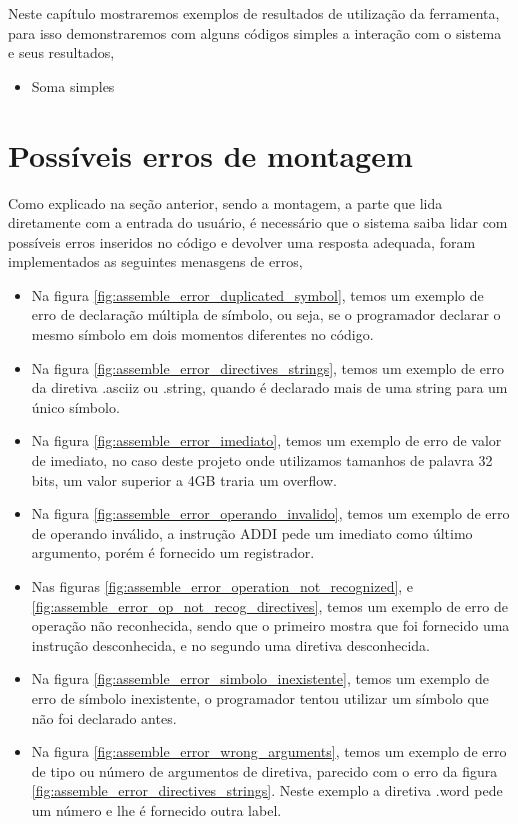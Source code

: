 Neste capítulo mostraremos exemplos de resultados de utilização da ferramenta, para isso demonstraremos com alguns códigos simples a interação com o sistema e seus resultados,

\begin{itemize}
	\item Soma simples
\end{itemize}


\section{Possíveis erros de montagem}

	Como explicado na seção anterior, sendo a montagem, a parte que lida diretamente com a entrada do usuário, é necessário que o sistema saiba lidar com possíveis erros inseridos no código e devolver uma resposta adequada, foram implementados as seguintes menasgens de erros,

	\begin{itemize}
		\item Na figura \ref{fig:assemble_error_duplicated_symbol}, temos um exemplo de erro de declaração múltipla de símbolo, ou seja, se o programador declarar o mesmo símbolo em dois momentos diferentes no código.
		\item Na figura \ref{fig:assemble_error_directives_strings}, temos um exemplo de erro da diretiva .asciiz ou .string, quando é declarado mais de uma string para um único símbolo.
		\item Na figura \ref{fig:assemble_error_imediato}, temos um exemplo de erro de valor de imediato, no caso deste projeto onde utilizamos tamanhos de palavra 32 bits, um valor superior a 4GB traria um overflow.
		\item Na figura \ref{fig:assemble_error_operando_invalido}, temos um exemplo de erro de operando inválido, a instrução ADDI pede um imediato como último argumento, porém é fornecido um registrador.
		\item Nas figuras \ref{fig:assemble_error_operation_not_recognized}, e \ref{fig:assemble_error_op_not_recog_directives}, temos um exemplo de erro de operação não reconhecida, sendo que o primeiro mostra que foi fornecido uma instrução desconhecida, e no segundo uma diretiva desconhecida.
		\item Na figura \ref{fig:assemble_error_simbolo_inexistente}, temos um exemplo de erro de símbolo inexistente, o programador tentou utilizar um símbolo que não foi declarado antes.
		\item Na figura \ref{fig:assemble_error_wrong_arguments}, temos um exemplo de erro de tipo ou número de argumentos de diretiva, parecido com o erro da figura \ref{fig:assemble_error_directives_strings}. Neste exemplo a diretiva .word pede um número e lhe é fornecido outra label.
	\end{itemize}

